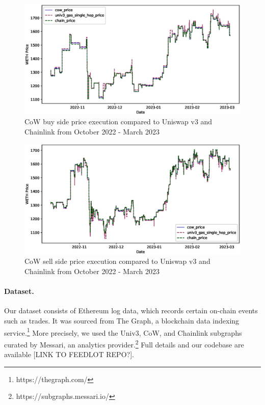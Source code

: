 \documentclass[a4paper,10pt]{article}
\theoremstyle{remark}
\begin{document}
\begin{figure}
  \begin{center} 
    \includegraphics[width=\textwidth * \real{0.7}]{diagrams/weth_buy_line.eps}
    \caption{CoW buy side price execution compared to Uniswap v3 and Chainlink from October 2022 - March 2023}
  \end{center}
\end{figure}

\begin{figure}
  \begin{center} 
    \includegraphics[width=\textwidth * \real{0.7}]{diagrams/weth_sell_line.eps}
    \caption{CoW sell side price execution compared to Uniswap v3 and Chainlink from October 2022 - March 2023}
  \end{center}
\end{figure}





\paragraph{Dataset.} Our dataset consists of Ethereum log data, which records certain on-chain events such as trades. It was sourced from The Graph, a blockchain data indexing service.\footnote{https://thegraph.com/}
%
More precisely, we used the Univ3, CoW, and Chainlink subgraphs curated by Messari, an analytics provider.\footnote{https://subgraphs.messari.io/}
%
Full details and our codebase are available [LINK TO FEEDLOT REPO?].
\end{document}
